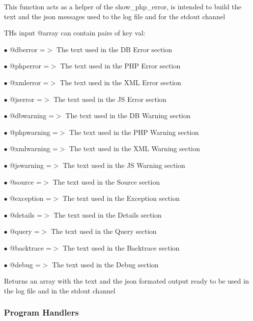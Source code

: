 \documentclass[a4paper]{article}
\begin{document}
This function acts as a helper of the show\_php\_error, is intended to build
the text and the json messages used to the log file and for the stdout channel

THs input @array can contain pairs of key val:

\begin{compactitem}
\item[\color{myblue}$\bullet$] @dberror    =$>$ The text used in the DB Error section
\item[\color{myblue}$\bullet$] @phperror   =$>$ The text used in the PHP Error section
\item[\color{myblue}$\bullet$] @xmlerror   =$>$ The text used in the XML Error section
\item[\color{myblue}$\bullet$] @jserror    =$>$ The text used in the JS Error section
\item[\color{myblue}$\bullet$] @dbwarning  =$>$ The text used in the DB Warning section
\item[\color{myblue}$\bullet$] @phpwarning =$>$ The text used in the PHP Warning section
\item[\color{myblue}$\bullet$] @xmlwarning =$>$ The text used in the XML Warning section
\item[\color{myblue}$\bullet$] @jswarning  =$>$ The text used in the JS Warning section
\item[\color{myblue}$\bullet$] @source     =$>$ The text used in the Source section
\item[\color{myblue}$\bullet$] @exception  =$>$ The text used in the Exception section
\item[\color{myblue}$\bullet$] @details    =$>$ The text used in the Details section
\item[\color{myblue}$\bullet$] @query      =$>$ The text used in the Query section
\item[\color{myblue}$\bullet$] @backtrace  =$>$ The text used in the Backtrace section
\item[\color{myblue}$\bullet$] @debug      =$>$ The text used in the Debug section
\end{compactitem}

Returns an array with the text and the json formated output ready to be used
in the log file and in the stdout channel

\hypertarget{toc114}{}
\subsubsection{Program Handlers}
\end{document}
